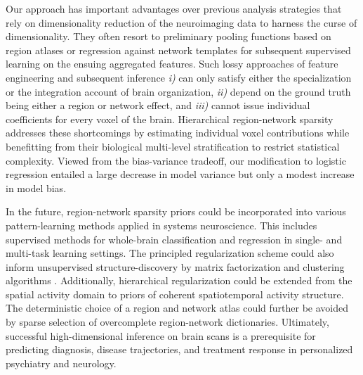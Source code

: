 \documentclass[runningheads,a4paper]{llncs}
\begin{document}
Our approach has important advantages over previous
analysis strategies that rely on dimensionality reduction of
the neuroimaging data to harness the curse of dimensionality.
They often resort to preliminary pooling functions based on region atlases
or regression against network templates
for subsequent supervised learning on the ensuing aggregated features.
Such lossy approaches of
feature engineering and subsequent inference
\textit{i)} can only satisfy either the specialization or
the integration account of brain organization,
\textit{ii)} depend on the ground truth being either a region or network effect,
and
\textit{iii)} cannot issue individual coefficients for every voxel of the brain.
%
Hierarchical region-network sparsity addresses these shortcomings
by estimating individual voxel contributions
while benefitting from their biological multi-level stratification
to restrict statistical complexity.
%
Viewed from the bias-variance tradeoff,
our modification to logistic regression
entailed a large decrease in model variance but only a modest
increase in model bias.

In the future,
region-network sparsity priors could be incorporated into various
pattern-learning methods applied in systems neuroscience.
%
This includes supervised methods for whole-brain classification and regression
in single- and multi-task learning settings.
The principled regularization scheme could also inform
unsupervised structure-discovery by
matrix factorization and clustering algorithms
\cite{jenatton2009structured}.
Additionally,
hierarchical regularization could be extended
from the spatial activity domain to
priors of coherent spatiotemporal activity structure.
%
The deterministic choice of a region and network atlas
could further be avoided by
sparse selection of overcomplete region-network dictionaries.
%
Ultimately,
successful high-dimensional inference on brain scans is
a prerequisite
for predicting diagnosis,
disease trajectories, and treatment response
in personalized psychiatry and neurology.
\nopagebreak
\small

% 

\end{document}
